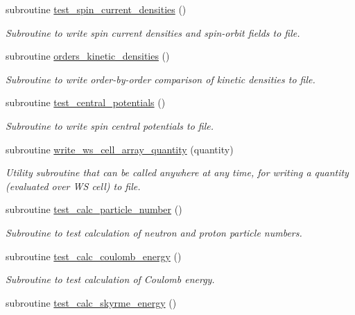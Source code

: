 \begin{DoxyCompactItemize}
subroutine \mbox{\hyperlink{namespacetest_a3e49a3b6fd835efb13dd446bfb6e8b1f}{test\+\_\+spin\+\_\+current\+\_\+densities}} ()
\begin{DoxyCompactList}\small\item\em Subroutine to write spin current densities and spin-\/orbit fields to file. \end{DoxyCompactList}\item 
subroutine \mbox{\hyperlink{namespacetest_a12069a39539c68f8d22f7eb4219d2e2b}{orders\+\_\+kinetic\+\_\+densities}} ()
\begin{DoxyCompactList}\small\item\em Subroutine to write order-\/by-\/order comparison of kinetic densities to file. \end{DoxyCompactList}\item 
subroutine \mbox{\hyperlink{namespacetest_a5693dbb30b96995df35fa720f0ab1436}{test\+\_\+central\+\_\+potentials}} ()
\begin{DoxyCompactList}\small\item\em Subroutine to write spin central potentials to file. \end{DoxyCompactList}\item 
subroutine \mbox{\hyperlink{namespacetest_ae6399ba2e0d2b484e6b467b2cee74a1b}{write\+\_\+ws\+\_\+cell\+\_\+array\+\_\+quantity}} (quantity)
\begin{DoxyCompactList}\small\item\em Utility subroutine that can be called anywhere at any time, for writing a quantity (evaluated over WS cell) to file. \end{DoxyCompactList}\item 
subroutine \mbox{\hyperlink{namespacetest_af860540d68e055817e3f618b7a04298a}{test\+\_\+calc\+\_\+particle\+\_\+number}} ()
\begin{DoxyCompactList}\small\item\em Subroutine to test calculation of neutron and proton particle numbers. \end{DoxyCompactList}\item 
subroutine \mbox{\hyperlink{namespacetest_ae4857dad0359d5f90718d5593398f8b3}{test\+\_\+calc\+\_\+coulomb\+\_\+energy}} ()
\begin{DoxyCompactList}\small\item\em Subroutine to test calculation of Coulomb energy. \end{DoxyCompactList}\item 
subroutine \mbox{\hyperlink{namespacetest_aa2a14f70fb7372abc970b6271f19417f}{test\+\_\+calc\+\_\+skyrme\+\_\+energy}} ()

\end{DoxyCompactItemize}
